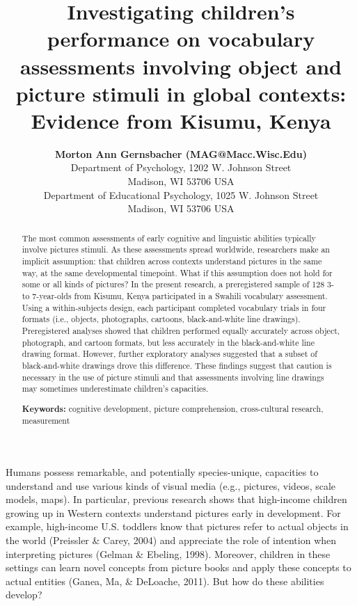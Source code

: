 \documentclass[10pt, letterpaper]{article}
\title{Investigating children's performance on vocabulary assessments
involving object and picture stimuli in global contexts: Evidence from
Kisumu, Kenya}
\author{{\large \bf Morton Ann Gernsbacher (MAG@Macc.Wisc.Edu)} \\ Department of Psychology, 1202 W. Johnson Street \\ Madison, WI 53706 USA
  \AND {\large \bf Sharon J.~Derry (SDJ@Macc.Wisc.Edu)} \\ Department of Educational Psychology, 1025 W. Johnson Street \\ Madison, WI 53706 USA}
\begin{document}
\maketitle

\begin{abstract}
The most common assessments of early cognitive and linguistic abilities
typically involve pictures stimuli. As these assessments spread
worldwide, researchers make an implicit assumption: that children across
contexts understand pictures in the same way, at the same developmental
timepoint. What if this assumption does not hold for some or all kinds
of pictures? In the present research, a preregistered sample of 128 3-
to 7-year-olds from Kisumu, Kenya participated in a Swahili vocabulary
assessment. Using a within-subjects design, each participant completed
vocabulary trials in four formats (i.e., objects, photographs, cartoons,
black-and-white line drawings). Preregistered analyses showed that
children performed equally accurately across object, photograph, and
cartoon formats, but less accurately in the black-and-white line drawing
format. However, further exploratory analyses suggested that a subset of
black-and-white drawings drove this difference. These findings suggest
that caution is necessary in the use of picture stimuli and that
assessments involving line drawings may sometimes underestimate
children's capacities.

\textbf{Keywords:}
cognitive development, picture comprehension, cross-cultural research,
measurement
\end{abstract}

Humans possess remarkable, and potentially species-unique, capacities to
understand and use various kinds of visual media (e.g., pictures,
videos, scale models, maps). In particular, previous research shows that
high-income children growing up in Western contexts understand pictures
early in development. For example, high-income U.S. toddlers know that
pictures refer to actual objects in the world (Preissler \& Carey, 2004)
and appreciate the role of intention when interpreting pictures (Gelman
\& Ebeling, 1998). Moreover, children in these settings can learn novel
concepts from picture books and apply these concepts to actual entities
(Ganea, Ma, \& DeLoache, 2011). But how do these abilities develop?
\end{document}
